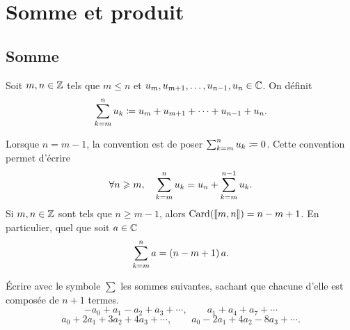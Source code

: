 \documentclass{magnolia}
\begin{document}



\section{Somme et produit}

\subsection{Somme}

\begin{definition}[utile=-3]
Soit $m,n\in\mathbb{Z}$ tels que $m \leq n$ et $u_{m},u_{m+1},\ldots,u_{n-1},u_n\in\mathbb{C}$. On
définit
\[\sum_{k=m}^n u_k\coloneqq u_{m}+u_{m+1}+\cdots+u_{n-1}+u_n.\]
\end{definition}

\begin{remarqueUnique}
\remarque Lorsque $n=m-1$, la convention est de poser $\sum_{k=m}^n u_k\coloneqq 0$. Cette
  convention permet d'écrire
  \[\forall n\geqslant m,\quad \sum_{k=m}^n u_k = u_n + \sum_{k=m}^{n-1} u_k.\]
\remarque Si $m,n\in\mathbb{Z}$ sont tels que $n\geq m-1$, alors $\operatorname{Card}(\left\llbracket m,n\right\rrbracket)=n-m+1$. En
  particulier, quel que soit $a\in\mathbb{C}$
  \[\sum_{k=m}^{n} a =\left(n-m+1\right)a.\]
\end{remarqueUnique}


\begin{exoUnique}
\exo Écrire avec le symbole $\sum$ les sommes suivantes, sachant que chacune d'elle est composée de $n+1$ termes.
  \[-a_0+a_1-a_2 +a_3+\cdots, \qquad a_1+a_4+a_7+\cdots\]
  \[a_0+2a_1+3a_2+4a_3+\cdots, \qquad a_0-2a_1+4a_2-8a_3+\cdots.\]
\end{exoUnique}
\end{document}
